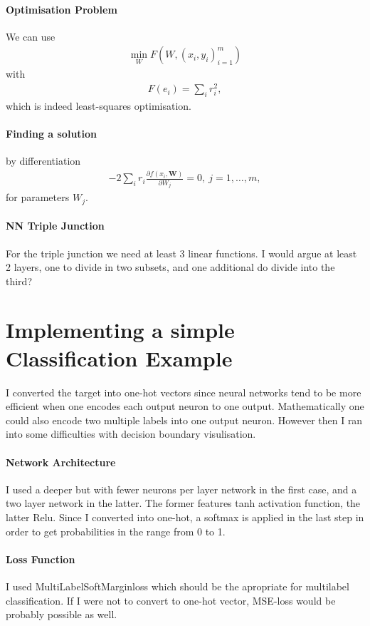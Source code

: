 \documentclass[11pt,a4paper,twoside]{article}
\begin{document}
\paragraph{Optimisation Problem} We can use
\begin{align}
	\min\limits_W F(W,{(x_i,y_i)}_{i=1}^m)
\end{align}
with
\begin{align}
	F(e_i) = \sum\limits_i r_i^2,
\end{align}
which is indeed least-squares optimisation.

\paragraph{Finding a solution} by differentiation
\begin{align}
	-2\sum _{i}r_{i}{\frac  {\partial f(x_{i},{\boldsymbol  W })}{\partial W _{j}}}=0,\ j=1,\ldots ,m,
\end{align}
for parameters $W_j$.

\paragraph{NN Triple Junction}
For the triple junction we need at least 3 linear functions.
I would argue at least 2 layers, one to divide in two subsets, and one additional do divide into the third?

\section{Implementing a simple Classification Example}
I converted the target into one-hot vectors since neural networks tend to be more efficient when one encodes each output neuron to one output.
Mathematically one could also encode two multiple labels into one output neuron.
However then I ran into some difficulties with decision boundary visulisation.
\paragraph{Network Architecture} I used a deeper but with fewer neurons per layer network in the first case, and a two layer network in the latter.
The former features tanh activation function, the latter Relu.
Since I converted into one-hot, a softmax is applied in the last step in order to get probabilities in the range from 0 to 1.

\paragraph{Loss Function} I used MultiLabelSoftMarginloss which should be the apropriate for multilabel classification.
If I were not to convert to one-hot vector, MSE-loss would be probably possible as well.
\end{document}
